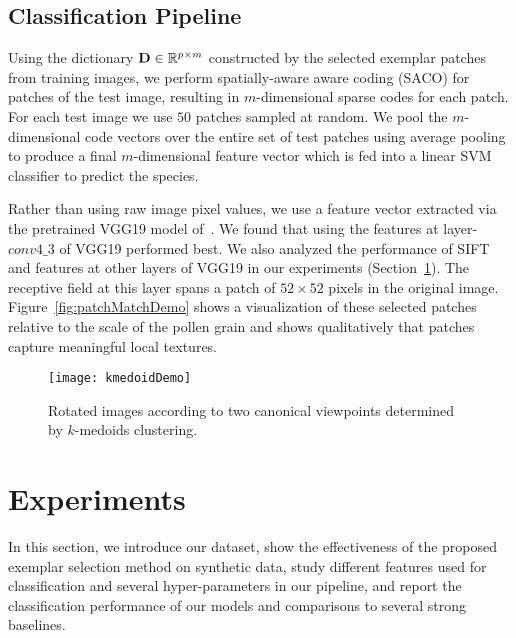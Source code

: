 \documentclass[10pt,twocolumn,letterpaper]{article}
\def\D{{\bf D}}
\def\RB{{\mathbb R}}
\begin{document}
\subsection{Classification Pipeline}
Using the dictionary $\D \in \RB^{p\times m}$ constructed by the selected
exemplar patches from training images, we perform spatially-aware aware coding
(SACO) for patches of the test image, resulting in $m$-dimensional sparse codes
for each patch.  For each test image we use $50$ patches sampled at random.  We
pool the $m$-dimensional code vectors over the entire set of test patches using
average pooling to produce a final $m$-dimensional feature vector which is fed
into a linear SVM classifier to predict the species.

Rather than using raw image pixel values, we use a feature vector extracted via
the pretrained VGG19 model of~\cite{simonyan2014very}.  We found that using the
features at layer-$conv4\_3$ of VGG19 performed best.  We also analyzed the
performance of SIFT and features at other layers of VGG19 in our experiments
(Section~\ref{sec:exp}).  The receptive field at this layer spans a patch of
$52\times 52$ pixels in the original image.  Figure~\ref{fig:patchMatchDemo}
shows a visualization of these selected patches relative to the scale of the
pollen grain and shows qualitatively that patches capture meaningful local
textures.

\begin{figure}[t]
\centering
   \texttt{[image: kmedoidDemo]}
\vspace{-1mm}
   \caption{Rotated images according to two canonical viewpoints determined by $k$-medoids clustering.
   }
\label{fig:kmedoidDemo}
\vspace{-5mm}
\end{figure}


\section{Experiments}
\label{sec:exp}
In this section, we introduce our dataset, show the effectiveness of the
proposed exemplar selection method on synthetic data, study different features
used for classification and several hyper-parameters in our pipeline, and
report the classification performance of our models and comparisons to several
strong baselines.
\end{document}
